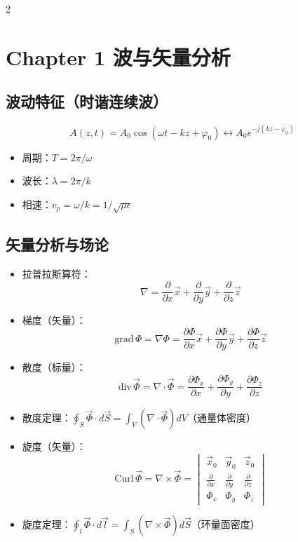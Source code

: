 \documentclass[10pt,a4paper,landscape]{article}
\begin{document}
\begin{multicols}{2}
\section{Chapter 1 波与矢量分析}
\subsection{波动特征（时谐连续波）}
\[
A(z,t) = A_0 \cos(\omega t - kz + \varphi_0) \longleftrightarrow A_0 e^{-j(kz - \varphi_0)}
\]
\begin{itemize}
    \item 周期：$T = 2\pi / \omega$
    \item 波长：$\lambda = 2\pi / k$
    \item 相速：$v_p = \omega / k = 1 / \sqrt{\mu\epsilon}$
\end{itemize}

\subsection{矢量分析与场论}
\begin{itemize}
    \item 拉普拉斯算符：
    \[
    \nabla = \frac{\partial}{\partial x}\vec{x} + \frac{\partial}{\partial y}\vec{y} + \frac{\partial}{\partial z}\vec{z}
    \]
    \item 梯度（矢量）：
    \[
    \text{grad}\,\Phi = \nabla\Phi = \frac{\partial\Phi}{\partial x}\vec{x} + \frac{\partial\Phi}{\partial y}\vec{y} + \frac{\partial\Phi}{\partial z}\vec{z}
    \]
    \item 散度（标量）：
    \[
    \text{div}\,\vec{\Phi} = \nabla\cdot\vec{\Phi} = \frac{\partial\Phi_x}{\partial x} + \frac{\partial\Phi_y}{\partial y} + \frac{\partial\Phi_z}{\partial z}
    \]
    \item 散度定理：$\oint_S \vec{\Phi}\cdot d\vec{S} = \int_V (\nabla\cdot\vec{\Phi})dV$（通量体密度）
    \item 旋度（矢量）：
    \[
    \text{Curl}\,\vec{\Phi} = \nabla\times\vec{\Phi} =
    \begin{vmatrix}
    \vec{x}_0 & \vec{y}_0 & \vec{z}_0 \\
    \frac{\partial}{\partial x} & \frac{\partial}{\partial y} & \frac{\partial}{\partial z} \\
    \Phi_x & \Phi_y & \Phi_z
    \end{vmatrix}
    \]
    \item 旋度定理：$\oint_l \vec{\Phi}\cdot d\vec{l} = \int_S (\nabla\times\vec{\Phi})d\vec{S}$（环量面密度）
\end{itemize}


\end{multicols}
\end{document}
